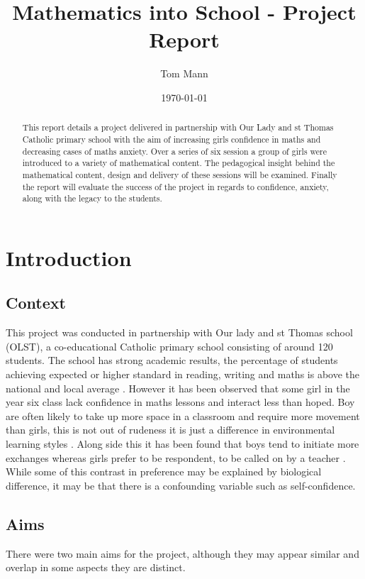 \documentclass[11pt, a4paper, notitlepage]{article}
\title{Mathematics into School - Project Report}
\author{Tom Mann}
\date{\today}
\begin{document}
\maketitle

\begin{abstract}
    This report details a project delivered in partnership with Our Lady and st Thomas Catholic primary school with the aim of increasing girls confidence in maths and decreasing cases of maths anxiety. Over a series of six session a group of girls were introduced to a variety of mathematical content. The pedagogical insight behind the mathematical content, design and delivery of these sessions will be examined. Finally the report will evaluate the success of the project in regards to confidence, anxiety, along with the legacy to the students.
\end{abstract}

\tableofcontents

\clearpage

\section{Introduction}

\subsection{Context}
This project was conducted in partnership with Our lady and st Thomas school (OLST), a  co-educational Catholic primary school consisting of around 120 students. The school has strong academic results, the percentage of students achieving expected or higher standard in reading, writing and maths is above the national and local average \cite{OLST_stats}. However it has been observed that some girl in the year six class lack confidence in maths lessons and interact less than hoped. Boy are often likely to take up more space in a classroom and require more movement than girls, this is not out of rudeness it is just a difference in environmental learning styles \cite{Hughes:2006}. Along side this it has been found that boys tend to initiate more exchanges whereas girls prefer to be respondent, to be called on by a teacher \cite{Rashid:2012}. While some of this contrast in preference may be explained by biological difference, it may be that there is a confounding variable such as self-confidence.


\subsection{Aims}
There were two main aims for the project, although they may appear similar and overlap in some aspects they are distinct.
\end{document}
